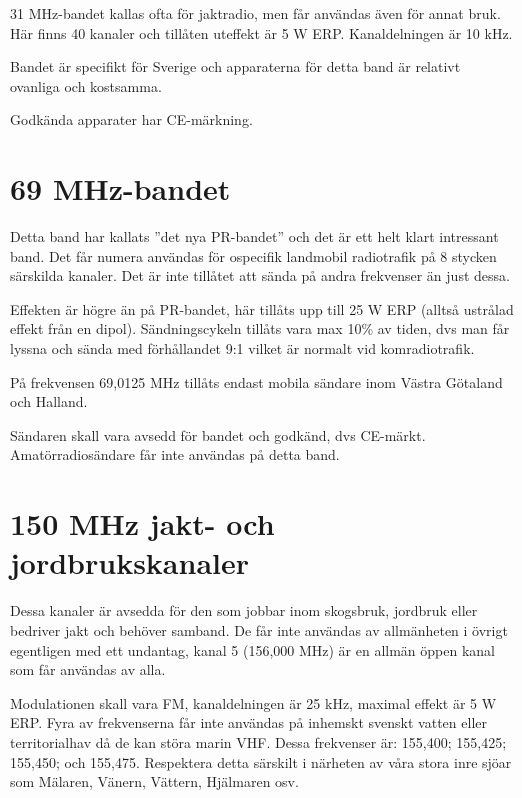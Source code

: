 \documentclass[12ypt,swedish,a4paper]{report}
\begin{document}
31 MHz-bandet kallas ofta för jaktradio, men får användas även för annat bruk.
Här finns 40 kanaler och tillåten uteffekt är 5 W ERP. Kanaldelningen är 10 kHz.

Bandet är specifikt för Sverige och apparaterna för detta band är relativt ovanliga och kostsamma.

Godkända apparater har CE-märkning.

\section{69 MHz-bandet}

Detta band har kallats ''det nya PR-bandet'' och det är ett helt klart intressant band. Det får numera användas för ospecifik landmobil radiotrafik på 8 stycken särskilda kanaler. Det är inte tillåtet att sända på andra frekvenser än just dessa.

Effekten är högre än på PR-bandet, här tillåts upp till 25 W ERP (alltså ustrålad effekt från en dipol). Sändningscykeln tillåts vara max 10\% av tiden, dvs man får lyssna och sända med förhållandet 9:1 vilket är normalt vid komradiotrafik.

På frekvensen 69,0125 MHz tillåts endast mobila sändare inom Västra Götaland och Halland. 

Sändaren skall vara avsedd för bandet och godkänd, dvs CE-märkt. Amatörradiosändare får inte användas på detta band.


\section{150 MHz jakt- och jordbrukskanaler}

Dessa kanaler är avsedda för den som jobbar inom skogsbruk, jordbruk eller bedriver jakt och behöver samband. De får inte användas av allmänheten i övrigt egentligen med ett undantag, kanal 5 (156,000 MHz) är en allmän öppen kanal som får användas av alla.

Modulationen skall vara FM, kanaldelningen är 25 kHz, maximal effekt är 5 W ERP. Fyra av frekvenserna får inte användas på inhemskt svenskt vatten eller territorialhav då de kan störa marin VHF. Dessa frekvenser är: 155,400; 155,425; 155,450; och 155,475. Respektera detta särskilt i närheten av våra stora inre sjöar som Mälaren, Vänern, Vättern, Hjälmaren osv.
\end{document}

